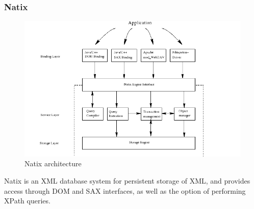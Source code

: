 \subsubsection{Natix}
\begin{figure}[!h]
  \centering
    \includegraphics[width=1\textwidth]{img/natix_architecture.png}
  \caption{Natix architecture}
\end{figure}
Natix is an XML database system for persistent storage of XML, and provides access through DOM and SAX interfaces, as well as the option of performing XPath queries.